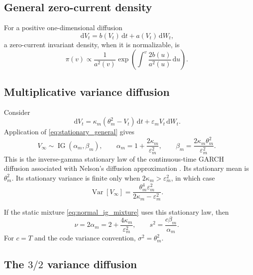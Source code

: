 \documentclass[11pt,a4paper]{article}
\DeclareMathOperator{\IG}{IG}
\DeclareMathOperator{\Var}{Var}
\newcommand{\dd}{\,\mathrm{d}}
\begin{document}
\subsection{General zero-current density}

For a positive one-dimensional diffusion
\begin{equation}
  \dd V_t=b(V_t)\dd t+a(V_t)\dd W_t,
\end{equation}
a zero-current invariant density, when it is normalizable, is
\begin{equation}
  \pi(v)\propto \frac{1}{a^2(v)}
  \exp\left(\int^v\frac{2b(u)}{a^2(u)}\dd u\right).
  \label{eq:stationary_general}
\end{equation}

\subsection{Multiplicative variance diffusion}

Consider
\begin{equation}
  \dd V_t=\kappa_m(\theta_m^2-V_t)\dd t
  +\varepsilon_mV_t\dd W_t.
  \label{eq:multiplicative_variance}
\end{equation}
Application of \eqref{eq:stationary_general} gives
\begin{equation}
  V_\infty\sim\IG(\alpha_m,\beta_m),\qquad
  \alpha_m=1+\frac{2\kappa_m}{\varepsilon_m^2},\qquad
  \beta_m=\frac{2\kappa_m\theta_m^2}{\varepsilon_m^2}.
  \label{eq:multiplicative_stationary}
\end{equation}
This is the inverse-gamma stationary law of the continuous-time GARCH
diffusion associated with Nelson's diffusion approximation
\cite{Nelson1990}.
Its stationary mean is $\theta_m^2$.  Its stationary variance is finite only
when $2\kappa_m>\varepsilon_m^2$, in which case
\begin{equation}
  \Var[V_\infty]
  =\frac{\theta_m^4\varepsilon_m^2}
  {2\kappa_m-\varepsilon_m^2}.
  \label{eq:multiplicative_stationary_variance}
\end{equation}

If the static mixture \eqref{eq:normal_ig_mixture} uses this stationary law,
then
\begin{equation}
  \nu=2\alpha_m=2+\frac{4\kappa_m}{\varepsilon_m^2},
  \qquad
  s^2=\frac{c\beta_m}{\alpha_m}.
  \label{eq:multiplicative_student_mapping}
\end{equation}
For $c=T$ and the code variance convention, $\sigma^2=\theta_m^2$.

\subsection{The \texorpdfstring{$3/2$}{3/2} variance diffusion}
\end{document}
